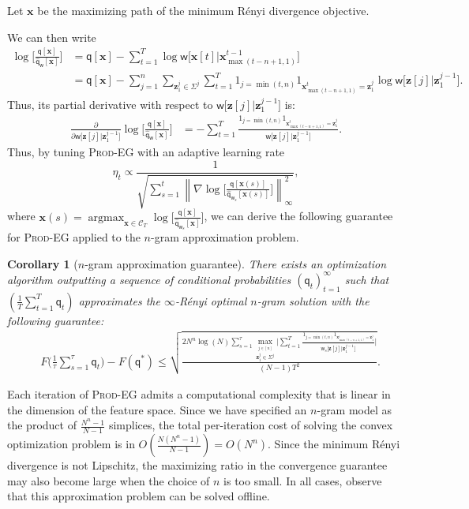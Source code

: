 \documentclass{article}
\DeclareMathOperator*{\argmax}{argmax}
\newcommand{\sC}{\mathscr C}
\newcommand{\bx}{{\mathbf x}}
\newcommand{\bz}{{\mathbf z}}
\newcommand{\sfq}{{\mathsf q}}
\newcommand{\sfw}{{\mathsf w}}
\newcommand{\cO}{O}
\newcommand{\h}{\widehat}
\newcommand{\ignore}[1]{}
\newtheorem{corollary}{Corollary}
\begin{document}
Let $\bx$ be the maximizing path of the minimum R\'{e}nyi divergence
objective. 
\ignore{We will use the $\vee$ symbol to denote the maximum between
two values, and the $\wedge$ symbol the denote the minimum.} 
We can then write
\begin{align*}
  \log \bigg[ \frac{\sfq[\bx]}{\h \sfq_\sfw[\bx]} \bigg]
  & = \sfq[\bx] - \sum_{t = 1}^T \log \sfw \big[\bx[t] \big| \bx_{\max(t - n +
  1, 1)}^{t - 1} \big] \\
  & = \sfq[\bx] - \sum_{j = 1}^n \sum_{\bz_1^j \in \Sigma^j} \sum_{t = 1}^T 1_{j = \min(t, n)} 1_{\bx_{\max(t - n
    + 1, 1)}^t = \bz_1^j} \log \sfw \Big[\bz[j] \Big| \bz_1^{j - 1} \Big].
\end{align*}
Thus, its partial derivative with respect to $\sfw \Big[\bz[j] \Big| \bz_1^{j - 1} \Big]$ is:
\begin{align*}
  \frac{\partial}{\partial \sfw \Big[\bz[j] \Big| \bz_1^{j - 1} \Big]}
  \log \bigg[ \frac{\sfq[\bx]}{\h \sfq_\sfw[\bx]} \bigg]
  & = - \sum_{t = 1}^T
    \frac{1_{j = \min(t, n)} 1_{\bx_{\max(t - n
    + 1, 1)}^t = \bz_1^j}}{\sfw \Big[\bz[j] \Big| \bz_1^{j - 1} \Big]}.
\end{align*}
Thus, by tuning \textsc{Prod-EG} with an adaptive learning rate
$$\eta_t \propto \frac{1}{\sqrt{ \sum_{s = 1}^t \left \|\nabla  \log
      \Big[ \frac{\sfq[\bx(s)]}{\h \sfq_{\sfw_s}[\bx(s)]} \Big]
    \right\|_\infty^2}},$$ where
$\bx(s) = \argmax_{\bx \in \sC_T} \log \Big[ \frac{\sfq[\bx]}{\h
  \sfq_{\sfw_s}[\bx]} \Big]$, we can derive the following guarantee
for \textsc{Prod-EG} applied to the $n$-gram approximation problem.
\begin{corollary}[$n$-gram approximation guarantee]
\label{cor:prodegngram}
There exists an optimization algorithm outputting a sequence of
conditional probabilities $(\sfq_t)_{t = 1}^\infty$ such that
$\left(\frac{1}{T} \sum_{t = 1}^T \sfq_t\right)$ approximates the
$\infty$-R\'{e}nyi optimal $n$-gram solution with the following
guarantee:
  \begin{align*}
    &F\Bigg(\frac{1}{\tau} \sum_{s = 1}^\tau \sfq_t\Bigg) - F(\sfq^*) \leq
  \sqrt{\frac{2 N^{n} \log(N) \sum_{s = 1}^\tau \max_{\stackrel{j \in
      [n]}{\bz_1^j \in \Sigma^j}} \bigg| 
      \sum_{t=1}^T \frac{1_{j = \min(t, n)} 1_{\bx_{\max(t - n
    + 1, 1)}^t = \bz_1^j}}{\sfw_s \big[\bz[j] \big| \bz_1^{j - 1} \big]}
      \bigg|}{(N - 1) T^2}}.
  \end{align*}
\end{corollary}
Each iteration of \textsc{Prod-EG} admits a computational complexity
that is linear in the dimension of the feature space. Since we have
specified an $n$-gram model as the product of $\frac{N^n - 1}{N - 1}$
simplices, the total per-iteration cost of solving the convex
optimization problem is in
$\cO\left(\frac{N(N^n - 1)}{N-1} \right) = \cO(N^n)$. Since the
minimum R\'{e}nyi divergence is not Lipschitz, the maximizing ratio in
the convergence guarantee may also become large when the choice of $n$
is too small. In all cases, observe that this approximation problem
can be solved offline.
\end{document}
